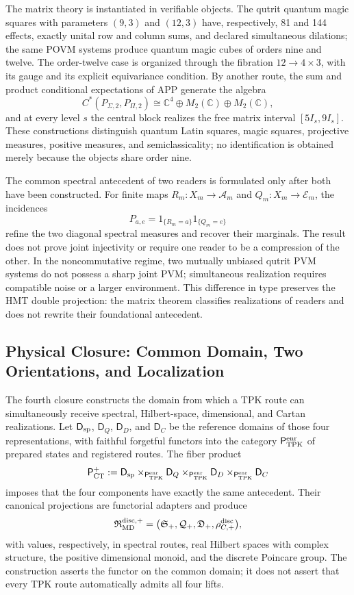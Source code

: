 The matrix theory is instantiated in verifiable objects. The qutrit quantum
magic squares with parameters \((9,3)\) and \((12,3)\) have, respectively,
81 and 144 effects, exactly unital row and column sums, and
declared simultaneous dilations; the same POVM systems produce quantum magic
cubes of orders nine and twelve. The order-twelve case is organized through
the fibration \(12\to4\times3\), with its gauge and its explicit
equivariance condition. By another route, the sum and product conditional expectations of APP
generate the algebra
\[
 C^*(P_{\Sigma,2},P_{\Pi,2})
 \cong\mathbb C^4\oplus M_2(\mathbb C)\oplus M_2(\mathbb C),
\]
and at every level \(s\) the central block realizes the free matrix interval
\([5I_s,9I_s]\). These constructions distinguish quantum Latin squares,
magic squares, projective measures, positive measures, and semiclassicality;
no identification is obtained merely because the objects share order
nine.

The common spectral antecedent of two readers is formulated only after
both have been constructed. For finite maps
\(R_m:X_m\to\mathcal A_m\) and \(Q_m:X_m\to\mathcal E_m\), the incidences
\[
 P_{a,e}=1_{\{R_m=a\}}1_{\{Q_m=e\}}
\]
refine the two diagonal spectral measures and recover their marginals. The
result does not prove joint injectivity or require one reader to be a
compression of the other. In the noncommutative regime, two mutually
unbiased qutrit PVM systems do not possess a sharp joint PVM; simultaneous realization requires
compatible noise or a larger environment. This difference in type preserves the
HMT double projection: the matrix theorem classifies realizations of readers
and does not rewrite their foundational antecedent.

\subsection*{Physical Closure: Common Domain, Two Orientations, and Localization}

The fourth closure constructs the domain from which a TPK route can simultaneously receive spectral, Hilbert-space, dimensional, and Cartan realizations. Let \(\mathsf D_{\rm sp}\), \(\mathsf D_Q\), \(\mathsf D_D\), and \(\mathsf D_C\) be the reference domains of those four representations, with faithful forgetful functors into the category \(\mathsf P_{\rm TPK}^{\rm enr}\) of prepared states and registered routes. The fiber product
\[
 \mathsf P_{\rm CT}^{+}
 :=\mathsf D_{\rm sp}
 \times_{\mathsf P_{\rm TPK}^{\rm enr}}\mathsf D_Q
 \times_{\mathsf P_{\rm TPK}^{\rm enr}}\mathsf D_D
 \times_{\mathsf P_{\rm TPK}^{\rm enr}}\mathsf D_C
\]
imposes that the four components have exactly the same antecedent.
Their canonical projections are functorial adapters and produce
\[
 \mathfrak R_{\rm MD}^{\rm disc,+}
 =\bigl(\mathfrak S_+,\mathcal Q_+,\mathfrak D_+,
        \rho_{C,+}^{\rm disc}\bigr),
\]
with values, respectively, in spectral routes, real Hilbert spaces
with complex structure, the positive dimensional monoid, and the discrete
Poincare group. The construction asserts the functor on the common domain; it does not
assert that every TPK route automatically admits all four lifts.

